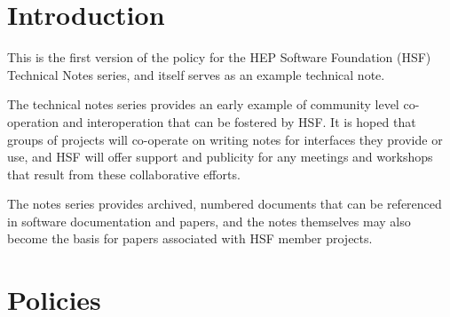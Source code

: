 \documentclass[12pt,a4paper]{article}
\begin{document}

\cleardoublepage

\renewcommand{\thefootnote}{\arabic{footnote}}
\setcounter{footnote}{0}


\pagestyle{plain} %
\setcounter{page}{1}

\linenumbers

\section{Introduction}
\label{sec:Introduction}

This is the first version of the policy for the HEP Software Foundation
(HSF) Technical Notes series, and itself serves as an example technical note.

The technical notes series provides an early example of community level co-operation and 
interoperation that can be fostered by HSF.
It is hoped that groups of projects will co-operate on writing notes for
interfaces they provide or use, and HSF will offer support and publicity for
any meetings and workshops that result from these collaborative efforts.

The notes series provides archived, numbered documents that can be referenced in
software documentation and papers, and the notes themselves may also become the 
basis for papers associated with HSF member projects.

\section{Policies}
\label{sec:Policies}
\end{document}
